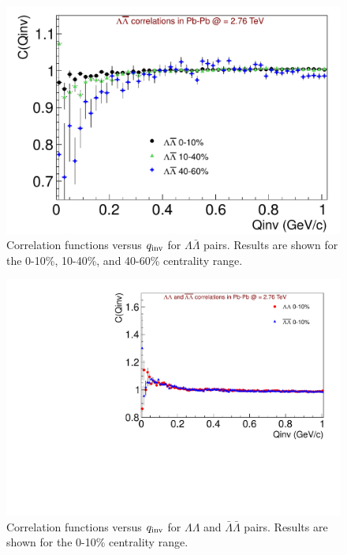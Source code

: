 {\begin{figure}[hbtp]
\includegraphics[scale=0.7]{LamALamCF_LooseCuts.pdf}
\caption[Correlation functions versus $q_{\rm inv}$ for $\Lambda\bar{\Lambda}$ pairs in three centrality ranges.]{Correlation functions versus $q_{\rm inv}$ for $\Lambda\bar{\Lambda}$ pairs.  Results are shown for the 0-10\%, 10-40\%, and 40-60\% centrality range.}
\label{fig:CFMixCentralities}
\end{figure}

\begin{figure}[hbtp]
\includegraphics[scale=0.7]{CFs_main_note.pdf}
\caption[Correlation functions versus $q_{\rm inv}$ for $\Lambda\Lambda$ and $\bar{\Lambda}\bar{\Lambda}$ pairs.]{Correlation functions versus $q_{\rm inv}$ for $\Lambda\Lambda$ and $\bar{\Lambda}\bar{\Lambda}$ pairs.  Results are shown for the 0-10\% centrality range.}
\label{fig:CF}
\end{figure}

}
